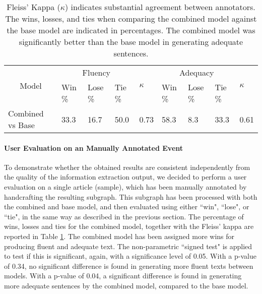 \documentclass[
]{ceurart}
\begin{document}
\begin{table}[ht]
	\caption{Fleiss' Kappa ($\kappa$) indicates substantial agreement between annotators. The wins, losses, and ties when comparing the combined model against the base model are indicated in percentages. The combined model was significantly better than the base model in generating adequate sentences.}

	\centering
	\begin{tabular}{|c|lll|l|lll|l|}
		\hline
		\multirow{2}{*}{Model}                 & \multicolumn{3}{c|}{Fluency} & \multirow{2}{*}{$\kappa$}    & \multicolumn{3}{c|}{Adequacy} & \multirow{2}{*}{$\kappa$}                                                                              \\ \cline{2-4} \cline{6-8}
		                                       & \multicolumn{1}{l|}{Win \%}  & \multicolumn{1}{l|}{Lose \%} & Tie \%                        &                           & \multicolumn{1}{l|}{Win \%} & \multicolumn{1}{l|}{Lose \%} & Tie \% &      \\ \hline
		\multicolumn{1}{|l|}{Combined vs Base} & \multicolumn{1}{l|}{33.3}    & \multicolumn{1}{l|}{16.7}    & 50.0                          & 0.73                      & \multicolumn{1}{l|}{58.3}   & \multicolumn{1}{l|}{8.3}     & 33.3   & 0.61 \\ \hline
	\end{tabular}
	\label{tab:article_annotations}
\end{table}


\paragraph*{User Evaluation on an Manually Annotated Event}
\label{sec:result_gen_event}



To demonstrate whether the obtained results are consistent independently from the quality of the information extraction output, we decided to perform a user evaluation on a single article (sample), which has been manually annotated by handcrafting the resulting subgraph. This subgraph has been processed with both the combined and base model, and then evaluated using either ``win", ``lose", or ``tie", in the same way as described in the previous section. The percentage of wins, losses and ties for the combined model, together with the Fleiss' kappa are reported in Table \ref{tab:article_annotations}. The combined model has been assigned more wins for producing fluent and adequate text. The non-parametric ``signed test" is applied to test if this is significant, again, with a significance level of 0.05. With a p-value of 0.34, no significant difference is found in generating more fluent texts between models. With a p-value of 0.04, a significant difference is found in generating more adequate sentences by the combined model, compared to the base model.
\end{document}
